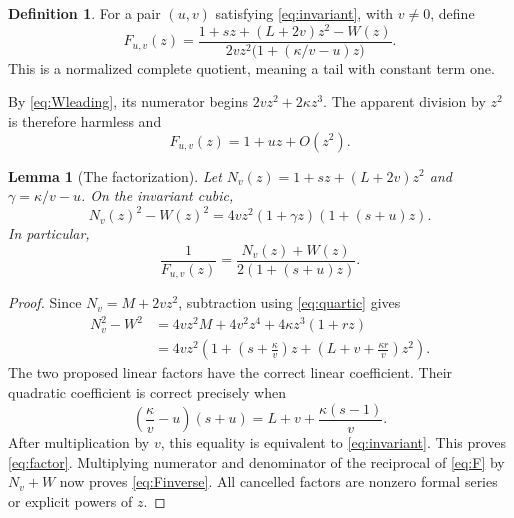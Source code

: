 \documentclass[11pt,letterpaper]{article}
\numberwithin{equation}{section}
\newtheorem{lemma}[theorem]{Lemma}
\theoremstyle{definition}
\newtheorem{definition}[theorem]{Definition}
\theoremstyle{remark}
\begin{document}
\begin{definition}
For a pair $(u,v)$ satisfying \eqref{eq:invariant}, with $v\ne0$, define
\begin{equation}\label{eq:F}
 F_{u,v}(z)=
 \frac{1+sz+(L+2v)z^2-W(z)}
 {2vz^2\bigl(1+(\kappa/v-u)z\bigr)}.
\end{equation}
This is a normalized complete quotient, meaning a tail with constant term one.
\end{definition}

By \eqref{eq:Wleading}, its numerator begins $2vz^2+2\kappa z^3$.
The apparent division by $z^2$ is therefore harmless and
\begin{equation}\label{eq:Fleading}
 F_{u,v}(z)=1+uz+O(z^2).
\end{equation}

\begin{lemma}[The factorization]\label{lem:factor}
Let $N_v(z)=1+sz+(L+2v)z^2$ and $\gamma=\kappa/v-u$.
On the invariant cubic,
\begin{equation}\label{eq:factor}
 N_v(z)^2-W(z)^2
 =4vz^2(1+\gamma z)(1+(s+u)z).
\end{equation}
In particular,
\begin{equation}\label{eq:Finverse}
 \frac1{F_{u,v}(z)}=
 \frac{N_v(z)+W(z)}{2(1+(s+u)z)}.
\end{equation}
\end{lemma}
\begin{proof}
Since $N_v=M+2vz^2$, subtraction using \eqref{eq:quartic} gives
\begin{align*}
 N_v^2-W^2
 &=4vz^2M+4v^2z^4+4\kappa z^3(1+rz)\\
 &=4vz^2\left(1+\left(s+\frac{\kappa}{v}\right)z+
            \left(L+v+\frac{\kappa r}{v}\right)z^2\right).
\end{align*}
The two proposed linear factors have the correct linear coefficient.
Their quadratic coefficient is correct precisely when
\[
 \left(\frac{\kappa}{v}-u\right)(s+u)
       =L+v+\frac{\kappa(s-1)}{v}.
\]
After multiplication by $v$, this equality is equivalent to
\eqref{eq:invariant}. This proves \eqref{eq:factor}.
Multiplying numerator and denominator of the reciprocal of
\eqref{eq:F} by $N_v+W$ now proves \eqref{eq:Finverse}.
All cancelled factors are nonzero formal series or explicit powers of $z$.
\end{proof}
\end{document}
